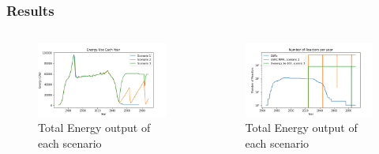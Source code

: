 \begin{frame}
\frametitle{Results}
    \begin{columns}
        \column[t]{5cm}
        \begin{figure}[t]
            \includegraphics[scale=0.26, trim=0 5 0 10,clip]{figures/energy_all.png}
            \caption{Total Energy output of each scenario}
            \label{fig:energy}
        \end{figure}
        \begin{figure}[ht]
            \includegraphics[scale=0.26, trim=0 5 0 10,clip]{figures/rx_deployment_all.png}
            \caption{Total Energy output of each scenario}
            \label{fig:ex_deployment}
        \end{figure}


\end{columns}
\end{frame}
